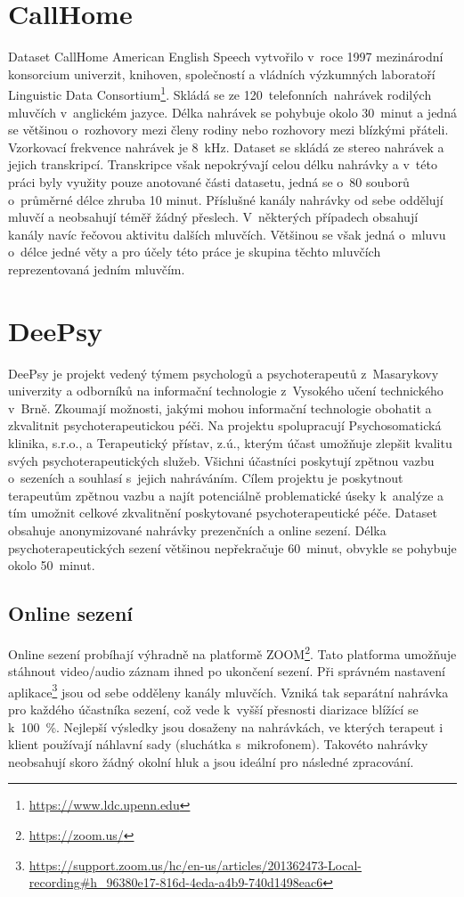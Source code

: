 
\section{CallHome}
Dataset CallHome American English Speech vytvořilo v~roce 1997 mezinárodní konsorcium univerzit, knihoven, společností a vládních výzkumných laboratoří Linguistic Data Consortium\footnote{\url{https://www.ldc.upenn.edu}}. Skládá se ze 120~telefonních~nahrávek rodilých mluvčích v~anglickém jazyce. Délka nahrávek se pohybuje okolo 30~minut a jedná se většinou o~rozhovory mezi členy rodiny nebo rozhovory mezi blízkými přáteli. Vzorkovací frekvence nahrávek je 8~kHz. Dataset se skládá ze stereo nahrávek a jejich transkripcí. Transkripce však nepokrývají celou délku nahrávky a v~této práci byly využity pouze anotované části datasetu, jedná se o~80 souborů o~průměrné délce zhruba 10 minut. Příslušné kanály nahrávky od sebe oddělují mluvčí a neobsahují téměř žádný přeslech. V~některých případech obsahují kanály navíc řečovou aktivitu dalších mluvčích. Většinou se však jedná o~mluvu o~délce jedné věty a pro účely této práce je skupina těchto mluvčích reprezentovaná jedním mluvčím.


\section{DeePsy}
DeePsy je projekt vedený týmem psychologů a psychoterapeutů z~Masarykovy univerzity a odborníků na informační technologie z~Vysokého učení technického v~Brně. Zkoumají možnosti, jakými mohou informační technologie obohatit a zkvalitnit psychoterapeutickou péči. Na projektu spolupracují Psychosomatická klinika, s.r.o., a Terapeutický přístav, z.ú., kterým účast umožňuje zlepšit kvalitu svých psychoterapeutických služeb. Všichni účastníci poskytují zpětnou vazbu o~sezeních a souhlasí s~jejich nahráváním. Cílem projektu je poskytnout terapeutům zpětnou vazbu a najít potenciálně problematické úseky k~analýze a tím umožnit celkové zkvalitnění poskytované psychoterapeutické péče. Dataset obsahuje anonymizované nahrávky prezenčních a online sezení. Délka psychoterapeutických sezení většinou nepřekračuje 60~minut, obvykle se pohybuje okolo 50~minut.

\subsection{Online sezení}
Online sezení probíhají výhradně na platformě ZOOM\footnote{\url{https://zoom.us/}}. Tato platforma umožňuje stáhnout video/audio záznam ihned po ukončení sezení. Při  správném nastavení aplikace\footnote{\url{https://support.zoom.us/hc/en-us/articles/201362473-Local-recording\#h_96380e17-816d-4eda-a4b9-740d1498eac6}} jsou od sebe odděleny kanály mluvčích. Vzniká tak separátní nahrávka pro každého účastníka sezení, což vede k~vyšší přesnosti diarizace blížící se k~100~\%. Nejlepší výsledky jsou dosaženy na nahrávkách, ve kterých terapeut i klient používají náhlavní sady (sluchátka s~mikrofonem). Takovéto nahrávky neobsahují skoro žádný okolní hluk a jsou ideální pro následné zpracování.

